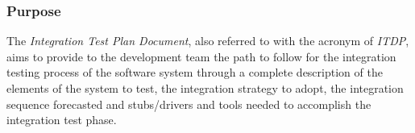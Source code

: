 \subsubsection{Purpose}

The \textit{Integration Test Plan Document}, also referred to with the acronym of \textit{ITDP}, aims to provide to the development team the path to follow for the integration testing process of the software system through a complete description of the elements of the system to test, the integration strategy to adopt, the integration sequence forecasted and stubs/drivers and tools needed to accomplish the integration test phase.
